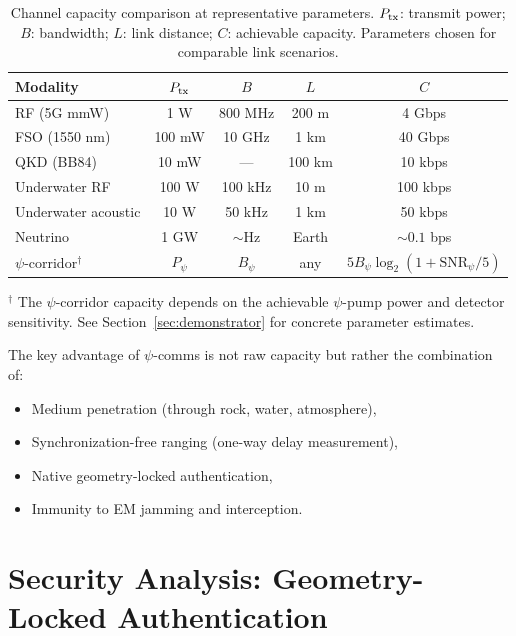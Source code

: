 \documentclass[twocolumn,superscriptaddress,prd,nofootinbib]{revtex4-2}
\newcommand{\SNR}{\mathrm{SNR}}
\begin{document}
\begin{table}[t]
\caption{Channel capacity comparison at representative parameters.
$P_{\rm tx}$: transmit power; $B$: bandwidth; $L$: link distance;
$C$: achievable capacity. Parameters chosen for comparable link
scenarios.}
\label{tab:capacity-comparison}
\begin{ruledtabular}
\begin{tabular}{lcccc}
Modality & $P_{\rm tx}$ & $B$ & $L$ & $C$ \\
\hline
RF (5G mmW) & 1 W & 800 MHz & 200 m & 4 Gbps \\
FSO (1550 nm) & 100 mW & 10 GHz & 1 km & 40 Gbps \\
QKD (BB84) & 10 mW & --- & 100 km & 10 kbps \\
Underwater RF & 100 W & 100 kHz & 10 m & 100 kbps \\
Underwater acoustic & 10 W & 50 kHz & 1 km & 50 kbps \\
Neutrino & 1 GW & $\sim$Hz & Earth & $\sim 0.1$ bps \\
\hline
$\psi$-corridor$^\dagger$ & $P_\psi$ & $B_\psi$ & any & $5B_\psi\log_2(1+\SNR_\psi/5)$ \\
\end{tabular}
\end{ruledtabular}
\begin{flushleft}
\footnotesize{$^\dagger$ The $\psi$-corridor capacity depends on the
achievable $\psi$-pump power and detector sensitivity.
See Section~\ref{sec:demonstrator} for concrete parameter estimates.}
\end{flushleft}
\end{table}

The key advantage of $\psi$-comms is not raw capacity but rather the
combination of:
\begin{itemize}
\item Medium penetration (through rock, water, atmosphere),
\item Synchronization-free ranging (one-way delay measurement),
\item Native geometry-locked authentication,
\item Immunity to EM jamming and interception.
\end{itemize}

\section{Security Analysis: Geometry-Locked Authentication}\label{sec:security}
\end{document}
